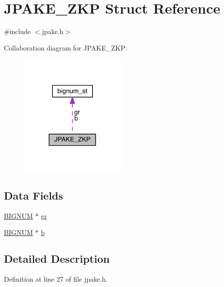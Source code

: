 \hypertarget{struct_j_p_a_k_e___z_k_p}{}\section{J\+P\+A\+K\+E\+\_\+\+Z\+KP Struct Reference}
\label{struct_j_p_a_k_e___z_k_p}


{\ttfamily \#include $<$jpake.\+h$>$}



Collaboration diagram for J\+P\+A\+K\+E\+\_\+\+Z\+KP\+:\nopagebreak
\begin{figure}[H]
\begin{center}
\leavevmode
\includegraphics[width=152pt]{struct_j_p_a_k_e___z_k_p__coll__graph}
\end{center}
\end{figure}
\subsection*{Data Fields}
\begin{DoxyCompactItemize}
\item 
\hyperlink{crypto_2ossl__typ_8h_a6fb19728907ec6515e4bfb716bffa141}{B\+I\+G\+N\+UM} $\ast$ \hyperlink{struct_j_p_a_k_e___z_k_p_a911c40767fedefc91a85632bd37eeb11}{gr}
\item 
\hyperlink{crypto_2ossl__typ_8h_a6fb19728907ec6515e4bfb716bffa141}{B\+I\+G\+N\+UM} $\ast$ \hyperlink{struct_j_p_a_k_e___z_k_p_a39b75e282bd52bbc10d6d26476907d03}{b}
\end{DoxyCompactItemize}


\subsection{Detailed Description}


Definition at line 27 of file jpake.\+h.



